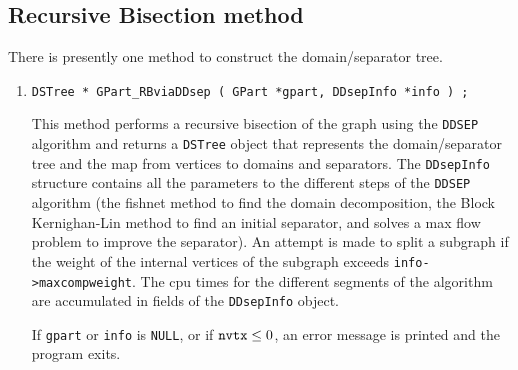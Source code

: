 \subsection{Recursive Bisection method}
\label{subsection:GPart:proto:RB}
\par
There is presently one method to construct the domain/separator tree.
\par
\begin{enumerate}
\item
\begin{verbatim}
DSTree * GPart_RBviaDDsep ( GPart *gpart, DDsepInfo *info ) ;
\end{verbatim}
This method performs a recursive bisection of the graph using the
{\tt DDSEP} algorithm and returns a {\tt DSTree} object that represents
the domain/separator tree and the map from vertices to domains and
separators.
The {\tt DDsepInfo} structure contains all the parameters to the
different steps of the {\tt DDSEP} algorithm (the fishnet method to find
the domain decomposition, the Block Kernighan-Lin method to find an
initial separator, and solves a max flow problem to
improve the separator).
An attempt is made to split a subgraph if the weight of the
internal vertices of the subgraph exceeds {\tt info->maxcompweight}.
The cpu times for the different segments of the algorithm are
accumulated in fields of the {\tt DDsepInfo} object.
\par {}
If {\tt gpart} or {\tt info} is {\tt NULL},
or if ${\tt nvtx} \le 0$,
an error message is printed and the program exits.
\end{enumerate}
\par
